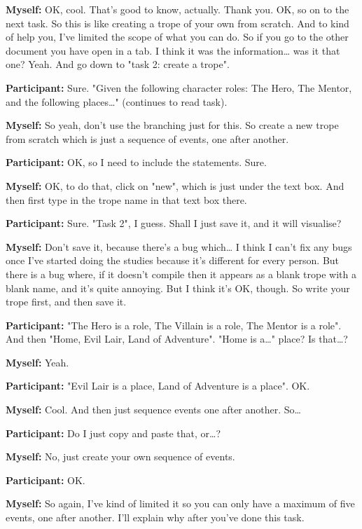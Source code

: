 \documentclass[11pt]{report}
\newcommand{\llabel}[1]{\hypertarget{llineno:#1}{\linelabel{#1}}}
\begin{document}
\begin{linenumbers}
\textbf{Myself:} OK, cool. That's good to know, actually. Thank you. OK, so on to the next task. So this is like creating a trope of your own from scratch. And to kind of help you, I've limited the scope of what you can do. So if you go to the other document you have open in a tab. I think it was the information\ldots{} was it that one? Yeah. And go down to "task 2: create a trope".

\textbf{Participant:} Sure. "Given the following character roles: The Hero, The Mentor, and the following places\ldots{}" (continues to read task).

\textbf{Myself:} So yeah, don't use the branching just for this. So create a new trope from scratch which is just a sequence of events, one after another.

\textbf{Participant:} OK, so I need to include the statements. Sure.

\textbf{Myself:} OK, to do that, click on "new", which is just under the text box. And then first type in the trope name in that text box there.

\textbf{Participant:} Sure. "Task 2", I guess. Shall I just save it, and it will visualise?

\textbf{Myself:} Don't save it, because there's a bug which\ldots{} I think I can't fix any bugs once I've started doing the studies because it's different for every person. But there is a bug where, if it doesn't compile then it appears as a blank trope with a blank name, and it's quite annoying. But I think it's OK, though. So write your trope first, and then save it.

\textbf{Participant:} "The Hero is a role, The Villain is a role, The Mentor is a role". And then "Home, Evil Lair, Land of Adventure". "Home is a\ldots{}" place? Is that\ldots{}?

\textbf{Myself:} Yeah.

\textbf{Participant:} "Evil Lair is a place, Land of Adventure is a place". OK.

\textbf{Myself:} Cool. And then just sequence events one after another. So\ldots{}

\textbf{Participant:} Do I just copy and paste that, or\ldots{}?

\textbf{Myself:} No, just create your own sequence of events.

\textbf{Participant:} OK.

\textbf{Myself:} So again, I've kind of limited it so you can only have a
maximum of five events, one after another. I'll explain why after you've done
this task.\llabel{lne:bug1e}


\end{linenumbers}
\end{document}
